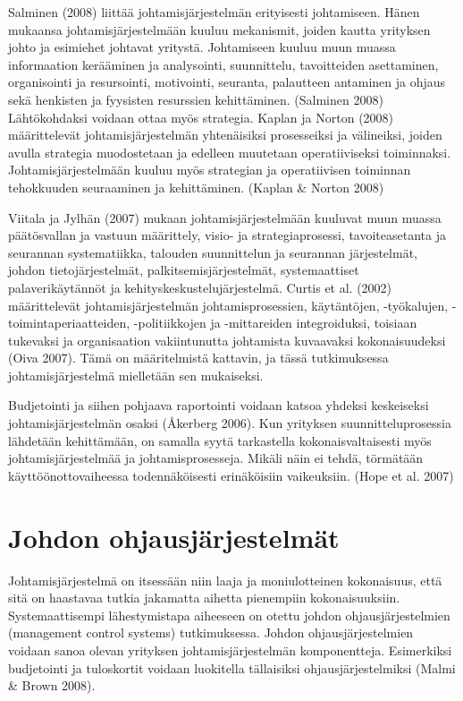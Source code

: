 \documentclass[12pt,a4paper,oneside,pdftex]{report}
\begin{document}
Salminen (2008) liittää johtamisjärjestelmän erityisesti johtamiseen. Hänen mukaansa johtamisjärjestelmään kuuluu mekanismit, joiden kautta yrityksen johto ja esimiehet johtavat yritystä. Johtamiseen kuuluu muun muassa informaation kerääminen ja analysointi, suunnittelu, tavoitteiden asettaminen, organisointi ja resursointi, motivointi, seuranta, palautteen antaminen ja ohjaus sekä henkisten ja fyysisten resurssien kehittäminen. (Salminen 2008) Lähtökohdaksi voidaan ottaa myös strategia. Kaplan ja Norton (2008) määrittelevät johtamisjärjestelmän yhtenäisiksi prosesseiksi ja välineiksi, joiden avulla strategia muodostetaan ja edelleen muutetaan operatiiviseksi toiminnaksi. Johtamisjärjestelmään kuuluu myös strategian ja operatiivisen toiminnan tehokkuuden seuraaminen ja kehittäminen. (Kaplan & Norton 2008)

Viitala ja Jylhän (2007) mukaan johtamisjärjestelmään kuuluvat muun muassa päätösvallan ja vastuun määrittely, visio- ja strategiaprosessi, tavoiteasetanta ja seurannan systematiikka, talouden suunnittelun ja seurannan järjestelmät, johdon tietojärjestelmät, palkitsemisjärjestelmät, systemaattiset palaverikäytännöt ja kehityskeskustelujärjestelmä. Curtis et al. (2002) määrittelevät johtamisjärjestelmän johtamisprosessien,  käytäntöjen, -työkalujen, -toimintaperiaatteiden, -politiikkojen ja -mittareiden integroiduksi, toisiaan tukevaksi ja organisaation vakiintunutta johtamista kuvaavaksi kokonaisuudeksi (Oiva 2007). Tämä on määritelmistä kattavin, ja tässä tutkimuksessa johtamisjärjestelmä mielletään sen mukaiseksi.

Budjetointi ja siihen pohjaava raportointi voidaan katsoa yhdeksi keskeiseksi johtamisjärjestelmän osaksi (Åkerberg 2006). Kun yrityksen suunnitteluprosessia lähdetään kehittämään, on samalla syytä tarkastella kokonaisvaltaisesti myös johtamisjärjestelmää ja johtamisprosesseja. Mikäli näin ei tehdä, törmätään käyttöönottovaiheessa todennäköisesti erinäköisiin vaikeuksiin. (Hope et al. 2007)

\section{Johdon ohjausjärjestelmät}

Johtamisjärjestelmä on itsessään niin laaja ja moniulotteinen kokonaisuus, että sitä on haastavaa tutkia jakamatta aihetta pienempiin kokonaisuuksiin. Systemaattisempi lähestymistapa aiheeseen on otettu johdon ohjausjärjestelmien (management control systems) tutkimuksessa. Johdon ohjausjärjestelmien voidaan sanoa olevan yrityksen johtamisjärjestelmän komponentteja. Esimerkiksi budjetointi ja tuloskortit voidaan luokitella tällaisiksi ohjausjärjestelmiksi (Malmi & Brown 2008).
\end{document}
